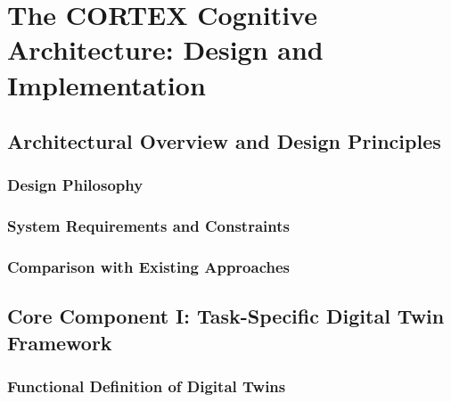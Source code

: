 
\chapter{The CORTEX Cognitive Architecture: Design and Implementation} \label{chp:cortex}


\section{Architectural Overview and Design Principles}

\subsection{Design Philosophy}

\subsection{System Requirements and Constraints}

\subsection{Comparison with Existing Approaches}

\section{Core Component I: Task-Specific Digital Twin Framework}

\subsection{Functional Definition of Digital Twins}

